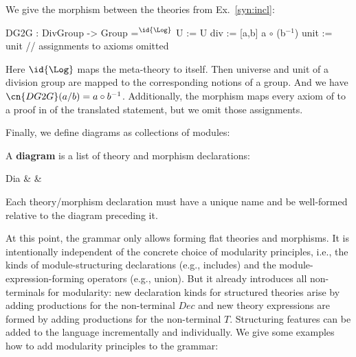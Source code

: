\begin{example}[Morphisms]\label{ex:dg2g}
We give the morphism  between the theories from Ex.~\ref{syn:incl}:
\begin{mmtcode}
DG2G : DivGroup -> Group =$^{\id{\Log}}$
  U     := U
  div 	:= [a,b] a $\circ$ (b$^{-1}$) 
  unit 	:= unit
  // assignments to axioms omitted
\end{mmtcode}
Here $\id{\Log}$ maps the meta-theory to itself.
Then universe and unit of a division group are mapped to the corresponding notions of a group.
And we have $\cn{DG2G}(a/b)=a\circ b^{-1}$.
Additionally, the morphism maps every axiom of  to a proof in  of the translated statement, but we omit those assignments.
\end{example}


Finally, we define diagrams as collections of modules:

\begin{definition}[Diagram]
A \textbf{diagram} is a list of theory and morphism declarations:
\begin{grammar}
Dia    &           & \\
\end{grammar}
Each theory/morphism declaration must have a unique name and be well-formed relative to the diagram preceding it.
\end{definition}

At this point, the grammar only allows forming flat theories and morphisms.
It is intentionally independent of the concrete choice of modularity principles, i.e., the kinds of module-structuring declarations (e.g., includes) and the module-expression-forming operators (e.g., union).
But it already introduces all non-terminals for modularity: new declaration kinds for structured theories arise by adding productions for the non-terminal $Dec$ and new theory expressions are formed by adding productions for the non-terminal $T$.
Structuring features can be added to the language incrementally and individually.
We give some examples how to add modularity principles to the grammar:

